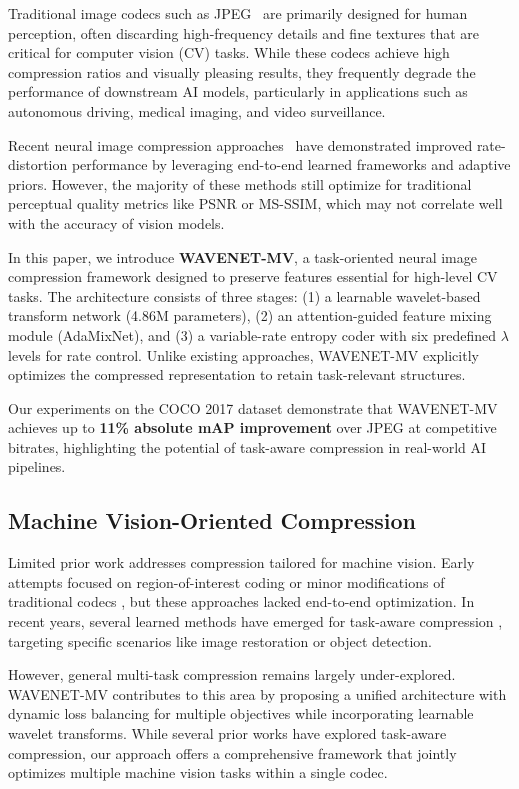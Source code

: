 \documentclass[conference]{IEEEtran}
\begin{document}
Traditional image codecs such as JPEG~\cite{wallace1992jpeg} are primarily designed for human perception, often discarding high-frequency details and fine textures that are critical for computer vision (CV) tasks. While these codecs achieve high compression ratios and visually pleasing results, they frequently degrade the performance of downstream AI models, particularly in applications such as autonomous driving, medical imaging, and video surveillance.

Recent neural image compression approaches~\cite{balle2016end, balle2018variational, cheng2020learned} have demonstrated improved rate-distortion performance by leveraging end-to-end learned frameworks and adaptive priors. However, the majority of these methods still optimize for traditional perceptual quality metrics like PSNR or MS-SSIM, which may not correlate well with the accuracy of vision models.

In this paper, we introduce \textbf{WAVENET-MV}, a task-oriented neural image compression framework designed to preserve features essential for high-level CV tasks. The architecture consists of three stages: (1) a learnable wavelet-based transform network (4.86M parameters), (2) an attention-guided feature mixing module (AdaMixNet), and (3) a variable-rate entropy coder with six predefined $\lambda$ levels for rate control. Unlike existing approaches, WAVENET-MV explicitly optimizes the compressed representation to retain task-relevant structures.

Our experiments on the COCO 2017 dataset demonstrate that WAVENET-MV achieves up to \textbf{11\% absolute mAP improvement} over JPEG at competitive bitrates, highlighting the potential of task-aware compression in real-world AI pipelines.


\subsection{Machine Vision-Oriented Compression}

Limited prior work addresses compression tailored for machine vision. Early attempts focused on region-of-interest coding \cite{christopoulos2000jpeg2000} or minor modifications of traditional codecs \cite{hoang2021atc}, but these approaches lacked end-to-end optimization. In recent years, several learned methods have emerged for task-aware compression \cite{ye2023cvpr, le2021icassp, li2021rl}, targeting specific scenarios like image restoration or object detection. 

However, general multi-task compression remains largely under-explored. WAVENET-MV contributes to this area by proposing a unified architecture with dynamic loss balancing for multiple objectives while incorporating learnable wavelet transforms. While several prior works have explored task-aware compression, our approach offers a comprehensive framework that jointly optimizes multiple machine vision tasks within a single codec.
\end{document}
